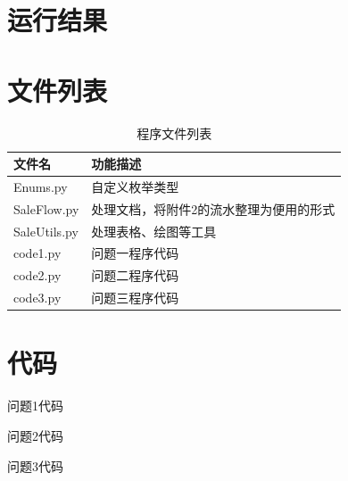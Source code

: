 \documentclass[withoutpreface,bwprint]{cumcmthesis} %
\begin{document}
\begin{appendices}

\section{运行结果}


\section{文件列表}
\begin{table}[H]
    \caption{程序文件列表}
    \centering
    \begin{tabularx}{\textwidth}{l X}
        \bottomrule
        文件名 & 功能描述 \\
        \midrule
        Enums.py & 自定义枚举类型 \\
        SaleFlow.py & 处理文档，将附件2的流水整理为便用的形式 \\
        SaleUtils.py & 处理表格、绘图等工具 \\
        code1.py & 问题一程序代码 \\
        code2.py & 问题二程序代码 \\
        code3.py & 问题三程序代码 \\
        \bottomrule
    \end{tabularx}
    \label{tab:文件列表}
\end{table}

\section{代码}
问题1代码

问题2代码

问题3代码


\end{appendices}
\end{document}
